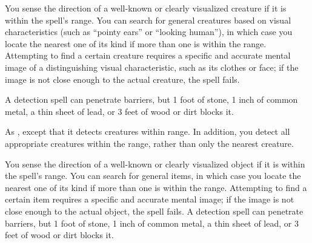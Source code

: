 \begin{spellheader}
    \spellrng{\rnglong}
\end{spellheader}
\begin{spellcontent}
    \spelldur{\durmed \dismissable}
    \spelleffect You sense the direction of a well-known or clearly visualized creature if it is within the spell's range. You can search for general creatures based on visual characteristics (such as ``pointy ears'' or ``looking human''), in which case you locate the nearest one of its kind if more than one is within the range. Attempting to find a certain creature requires a specific and accurate mental image of a distinguishing visual characteristic, such as its clothes or face; if the image is not close enough to the actual creature, the spell fails.
    \spelldur{\durlong \dismissable}
\end{spellcontent}
\begin{spellfooter}
    \spellnotes A detection spell can penetrate barriers, but 1 foot of stone, 1 inch of common metal, a thin sheet of lead, or 3 feet of wood or dirt blocks it.
\end{spellfooter}

\begin{spellheader}
\end{spellheader}
\begin{spellcontent}
    \spellrng{\rngext}
    \spelleffect As , except that it detects creatures within \rngext range. In addition, you detect all appropriate creatures within the range, rather than only the nearest creature.
    \spelldur{\durmed \dismissable}
\end{spellcontent}
\begin{spellfooter}

\end{spellfooter}

\begin{spellheader}
    \spellrng{\rnglong}
\end{spellheader}
\begin{spellcontent}
    \spelleffect You sense the direction of a well-known or clearly visualized object if it is within the spell's range. You can search for general items, in which case you locate the nearest one of its kind if more than one is within the range. Attempting to find a certain item requires a specific and accurate mental image; if the image is not close enough to the actual object, the spell fails.
    \spellnotes A detection spell can penetrate barriers, but 1 foot of stone, 1 inch of common metal, a thin sheet of lead, or 3 feet of wood or dirt blocks it.
    \spelldur{\durmed \dismissable}
\end{spellcontent}
\begin{spellfooter}

\end{spellfooter}

